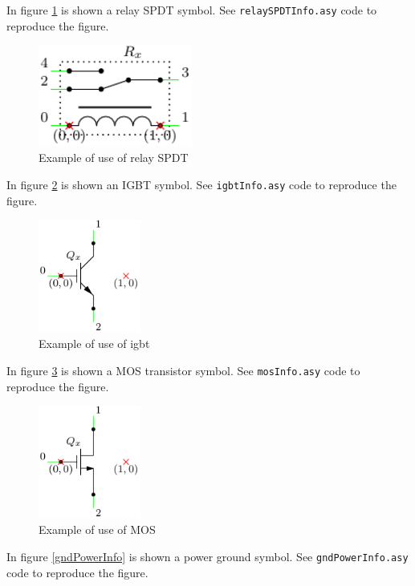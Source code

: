 \documentclass[a4paper,12pt]{report}
\begin{document}
In figure \ref{relaySPDTInfo} is shown a relay SPDT symbol. See \texttt{relaySPDTInfo.asy} code to reproduce the figure.

\begin{figure}[ht]
\centering
\includegraphics[width=0.45\textwidth]{relaySPDTInfo}
\caption{Example of use of relay SPDT}
\label{relaySPDTInfo}
\end{figure}

In figure \ref{igbtInfo} is shown an IGBT symbol. See \texttt{igbtInfo.asy} code to reproduce the figure.

\begin{figure}[ht]
\centering
\includegraphics[width=0.3\textwidth]{igbtInfo}
\caption{Example of use of igbt}
\label{igbtInfo}
\end{figure}

In figure \ref{mosInfo} is shown a MOS transistor symbol. See \texttt{mosInfo.asy} code to reproduce the figure.

\begin{figure}[ht]
\centering
\includegraphics[width=0.3\textwidth]{mosInfo}
\caption{Example of use of MOS}
\label{mosInfo}
\end{figure}

In figure \ref{gndPowerInfo} is shown a power ground symbol. See \texttt{gndPowerInfo.asy} code to reproduce the figure.
\end{document}
